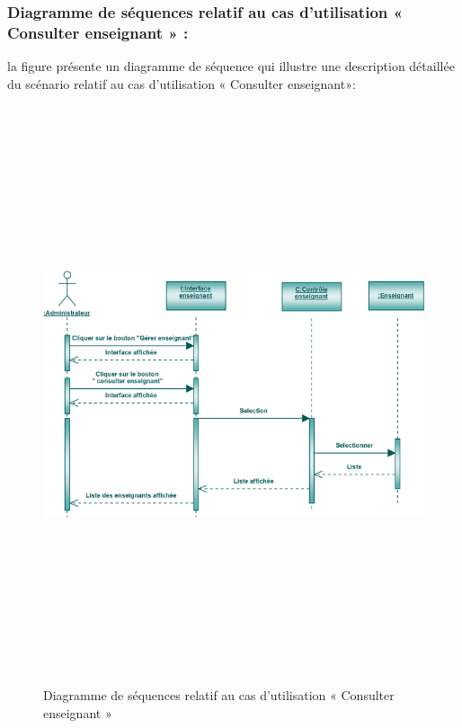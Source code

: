 \documentclass[12 pt]{report}
\begin{document}
\subsubsection{Diagramme de séquences relatif au cas d’utilisation « Consulter enseignant » :}
la figure   présente un diagramme de séquence qui illustre une description détaillée du scénario relatif au cas d’utilisation «  Consulter enseignant»: 
{\begin{figure}[h]
 \begin{center}
\includegraphics[width= 18 cm ,height=  17cm]{sec_cons_ens.PNG}
\caption{Diagramme de séquences relatif au cas d’utilisation « Consulter enseignant »}

\end{center}
\end{figure}}
\newpage
\end{document}
